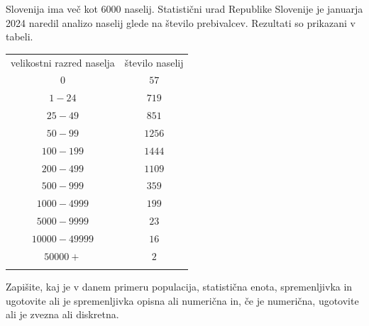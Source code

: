             \begin{naloga}
                    Slovenija ima več kot $6000$ naselij. Statistični urad Republike Slovenije je januarja 2024 naredil analizo naselij glede na število prebivalcev. 
                    Rezultati so prikazani v tabeli. 

                    \begin{table}[H]
                        \centering
                        \begin{tabular}{||c|c||} 
                        \hhline{|t:==:t|}
                        \rowcolor[rgb]{0.843,0.718,0.718} 
                        velikostni razred naselja  & število naselij   \\ 
                        \hhline{|:==:|}
                        $0$ & $57$    \\ 
                        \hline
                        $1-24$ & $719$    \\ 
                        \hline
                        $25-49$ & $851$    \\ 
                        \hline
                        $50-99$ & $1256$     \\
                        \hline
                        $100-199$ & $1444$     \\
                        \hline
                        $200-499$ & $1109$     \\
                        \hline
                        $500-999$ & $359$     \\
                        \hline
                        $1000-4999$ & $199$     \\
                        \hline
                        $5000-9999$ & $23$     \\
                        \hline
                        $10000-49999$ & $16$     \\                    
                        \hline
                        $50000+$ & $2$     \\
                        \hhline{|b:==:b|}
                        \end{tabular}
                    \end{table}
                
                    Zapišite, kaj je v danem primeru populacija, statistična enota, spremenljivka in ugotovite ali je spremenljivka opisna ali numerična in, 
                    če je numerična, ugotovite ali je zvezna ali diskretna.
            \end{naloga}




